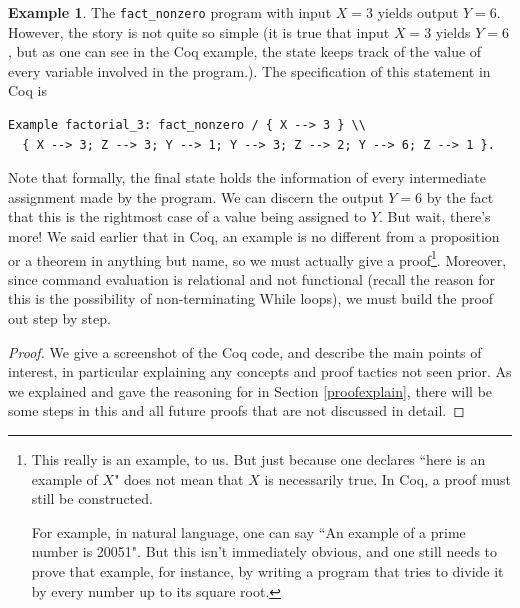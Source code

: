 \documentclass[12pt,notitlepage]{report}
\theoremstyle{plain}
\theoremstyle{definition}
\newtheorem{example}[theo]{Example}
\numberwithin{equation}{section}
\begin{document}
\begin{example}\label{firstoff}
    The \verb$fact_nonzero$ program with input $X=3$ yields output $Y=6$.  However, the story is not quite so simple (it is true that input $X=3$ yields $Y=6$, but as one can see in the Coq example, the state keeps track of the value of every variable involved in the program.).  The specification of this statement in Coq is
\begin{verbatim}
Example factorial_3: fact_nonzero / { X --> 3 } \\
  { X --> 3; Z --> 3; Y --> 1; Y --> 3; Z --> 2; Y --> 6; Z --> 1 }.
\end{verbatim}
    Note that formally, the final state holds the information of every intermediate assignment made by the program.  We can discern the output $Y=6$ by the fact that this is the rightmost case of a value being assigned to $Y$.  But wait, there's more!  We said earlier that in Coq, an example is no different from a proposition or a theorem in anything but name, so we must actually give a proof\footnote{This really is an example, to us.  But just because one declares ``here is an example of $X$" does not mean that $X$ is necessarily true.  In Coq, a proof must still be constructed.\par For example, in natural language, one can say ``An example of a prime number is 20051".  But this isn't immediately obvious, and one still needs to prove that example, for instance, by writing a program that tries to divide it by every number up to its square root.}.  Moreover, since command evaluation is relational and not functional (recall the reason for this is the possibility of non-terminating While loops), we must build the proof out step by step.
    \begin{proof}
        We give a screenshot of the Coq code, and describe the main points of interest, in particular explaining any concepts and proof tactics not seen prior.  As we explained and gave the reasoning for in Section \ref{proofexplain}, there will be some steps in this and all future proofs that are not discussed in detail.
        

\end{proof}
\end{example}
\end{document}
